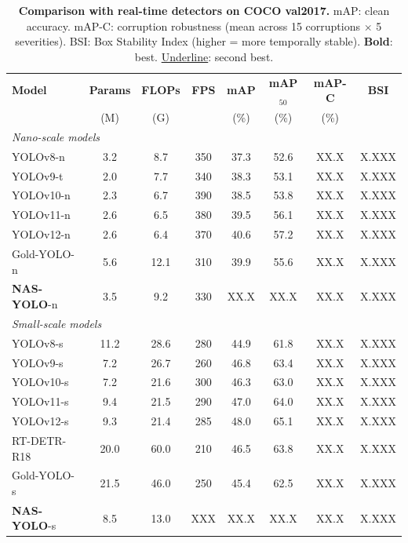 \documentclass[review]{eccv2026}
\newcommand{\ours}{\textbf{NAS-YOLO}}
\newcommand{\best}[1]{\textbf{#1}}
\newcommand{\second}[1]{\underline{#1}}
\newcommand{\nasNmap}{XX.X}
\newcommand{\nasNmapFifty}{XX.X}
\newcommand{\nasNmapC}{XX.X}
\newcommand{\nasNbsi}{X.XXX}
\newcommand{\nasSmap}{XX.X}
\newcommand{\nasSmapFifty}{XX.X}
\newcommand{\nasSmapC}{XX.X}
\newcommand{\nasSbsi}{X.XXX}
\newcommand{\nasSfps}{XXX}
\newcommand{\yoloEightNmapC}{XX.X}
\newcommand{\yoloEightNbsi}{X.XXX}
\newcommand{\yoloNineTmapC}{XX.X}
\newcommand{\yoloNineTbsi}{X.XXX}
\newcommand{\yoloTenNmapC}{XX.X}
\newcommand{\yoloTenNbsi}{X.XXX}
\newcommand{\yoloElevenNmapC}{XX.X}
\newcommand{\yoloElevenNbsi}{X.XXX}
\newcommand{\yoloTwelveNmapC}{XX.X}
\newcommand{\yoloTwelveNbsi}{X.XXX}
\newcommand{\goldNmapC}{XX.X}
\newcommand{\goldNbsi}{X.XXX}
\newcommand{\yoloEightSmapC}{XX.X}
\newcommand{\yoloEightSbsi}{X.XXX}
\newcommand{\yoloNineSmapC}{XX.X}
\newcommand{\yoloNineSbsi}{X.XXX}
\newcommand{\yoloTenSmapC}{XX.X}
\newcommand{\yoloTenSbsi}{X.XXX}
\newcommand{\yoloElevenSmapC}{XX.X}
\newcommand{\yoloElevenSbsi}{X.XXX}
\newcommand{\yoloTwelveSmapC}{XX.X}
\newcommand{\yoloTwelveSbsi}{X.XXX}
\newcommand{\rtdetrMapC}{XX.X}
\newcommand{\rtdetrBsi}{X.XXX}
\newcommand{\goldSmapC}{XX.X}
\newcommand{\goldSbsi}{X.XXX}
\begin{document}
\begin{table}[t]
  \centering
  \caption{\textbf{Comparison with real-time detectors on COCO val2017.}
  mAP: clean accuracy. mAP-C: corruption robustness (mean across 15 corruptions $\times$ 5 severities).
  BSI: Box Stability Index (higher = more temporally stable).
  \best{Bold}: best. \second{Underline}: second best.}
  \label{tab:main}
  \vspace{4pt}
  \small
  \setlength{\tabcolsep}{4pt}
  \begin{tabular}{l|ccc|cc|cc}
    \toprule
    \textbf{Model} & \textbf{Params} & \textbf{FLOPs} & \textbf{FPS} & \textbf{mAP} & \textbf{mAP$_{50}$} & \textbf{mAP-C} & \textbf{BSI} \\
    & (M) & (G) & & (\%) & (\%) & (\%) & \\
    \midrule
    \multicolumn{8}{l}{\textit{Nano-scale models}} \\
    YOLOv8-n & 3.2 & 8.7 & 350 & 37.3 & 52.6 & \yoloEightNmapC & \yoloEightNbsi \\
    YOLOv9-t & 2.0 & 7.7 & 340 & 38.3 & 53.1 & \yoloNineTmapC & \yoloNineTbsi \\
    YOLOv10-n & 2.3 & 6.7 & 390 & 38.5 & 53.8 & \yoloTenNmapC & \yoloTenNbsi \\
    YOLOv11-n & 2.6 & 6.5 & 380 & 39.5 & 56.1 & \yoloElevenNmapC & \yoloElevenNbsi \\
    YOLOv12-n & 2.6 & 6.4 & 370 & 40.6 & 57.2 & \yoloTwelveNmapC & \yoloTwelveNbsi \\
    Gold-YOLO-n & 5.6 & 12.1 & 310 & 39.9 & 55.6 & \goldNmapC & \goldNbsi \\
    \rowcolor{bestcolor} \ours{}-n & 3.5 & 9.2 & 330 & \nasNmap & \nasNmapFifty & \nasNmapC & \nasNbsi \\
    \midrule
    \multicolumn{8}{l}{\textit{Small-scale models}} \\
    YOLOv8-s & 11.2 & 28.6 & 280 & 44.9 & 61.8 & \yoloEightSmapC & \yoloEightSbsi \\
    YOLOv9-s & 7.2 & 26.7 & 260 & 46.8 & 63.4 & \yoloNineSmapC & \yoloNineSbsi \\
    YOLOv10-s & 7.2 & 21.6 & 300 & 46.3 & 63.0 & \yoloTenSmapC & \yoloTenSbsi \\
    YOLOv11-s & 9.4 & 21.5 & 290 & 47.0 & 64.0 & \yoloElevenSmapC & \yoloElevenSbsi \\
    YOLOv12-s & 9.3 & 21.4 & 285 & 48.0 & 65.1 & \yoloTwelveSmapC & \yoloTwelveSbsi \\
    RT-DETR-R18 & 20.0 & 60.0 & 210 & 46.5 & 63.8 & \rtdetrMapC & \rtdetrBsi \\
    Gold-YOLO-s & 21.5 & 46.0 & 250 & 45.4 & 62.5 & \goldSmapC & \goldSbsi \\
    \rowcolor{bestcolor} \ours{}-s & 8.5 & 13.0 & \nasSfps & \nasSmap & \nasSmapFifty & \nasSmapC & \nasSbsi \\
    \bottomrule
  \end{tabular}
\end{table}
\end{document}
